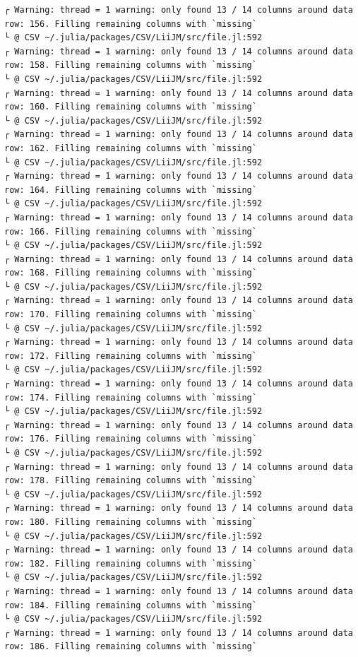 \documentclass[
  letterpaper,
  DIV=11,
  numbers=noendperiod]{scrartcl}
\begin{document}
\begin{verbatim}
┌ Warning: thread = 1 warning: only found 13 / 14 columns around data row: 156. Filling remaining columns with `missing`
└ @ CSV ~/.julia/packages/CSV/LiiJM/src/file.jl:592
┌ Warning: thread = 1 warning: only found 13 / 14 columns around data row: 158. Filling remaining columns with `missing`
└ @ CSV ~/.julia/packages/CSV/LiiJM/src/file.jl:592
┌ Warning: thread = 1 warning: only found 13 / 14 columns around data row: 160. Filling remaining columns with `missing`
└ @ CSV ~/.julia/packages/CSV/LiiJM/src/file.jl:592
┌ Warning: thread = 1 warning: only found 13 / 14 columns around data row: 162. Filling remaining columns with `missing`
└ @ CSV ~/.julia/packages/CSV/LiiJM/src/file.jl:592
┌ Warning: thread = 1 warning: only found 13 / 14 columns around data row: 164. Filling remaining columns with `missing`
└ @ CSV ~/.julia/packages/CSV/LiiJM/src/file.jl:592
┌ Warning: thread = 1 warning: only found 13 / 14 columns around data row: 166. Filling remaining columns with `missing`
└ @ CSV ~/.julia/packages/CSV/LiiJM/src/file.jl:592
┌ Warning: thread = 1 warning: only found 13 / 14 columns around data row: 168. Filling remaining columns with `missing`
└ @ CSV ~/.julia/packages/CSV/LiiJM/src/file.jl:592
┌ Warning: thread = 1 warning: only found 13 / 14 columns around data row: 170. Filling remaining columns with `missing`
└ @ CSV ~/.julia/packages/CSV/LiiJM/src/file.jl:592
┌ Warning: thread = 1 warning: only found 13 / 14 columns around data row: 172. Filling remaining columns with `missing`
└ @ CSV ~/.julia/packages/CSV/LiiJM/src/file.jl:592
┌ Warning: thread = 1 warning: only found 13 / 14 columns around data row: 174. Filling remaining columns with `missing`
└ @ CSV ~/.julia/packages/CSV/LiiJM/src/file.jl:592
┌ Warning: thread = 1 warning: only found 13 / 14 columns around data row: 176. Filling remaining columns with `missing`
└ @ CSV ~/.julia/packages/CSV/LiiJM/src/file.jl:592
┌ Warning: thread = 1 warning: only found 13 / 14 columns around data row: 178. Filling remaining columns with `missing`
└ @ CSV ~/.julia/packages/CSV/LiiJM/src/file.jl:592
┌ Warning: thread = 1 warning: only found 13 / 14 columns around data row: 180. Filling remaining columns with `missing`
└ @ CSV ~/.julia/packages/CSV/LiiJM/src/file.jl:592
┌ Warning: thread = 1 warning: only found 13 / 14 columns around data row: 182. Filling remaining columns with `missing`
└ @ CSV ~/.julia/packages/CSV/LiiJM/src/file.jl:592
┌ Warning: thread = 1 warning: only found 13 / 14 columns around data row: 184. Filling remaining columns with `missing`
└ @ CSV ~/.julia/packages/CSV/LiiJM/src/file.jl:592
┌ Warning: thread = 1 warning: only found 13 / 14 columns around data row: 186. Filling remaining columns with `missing`

\end{verbatim}
\end{document}
